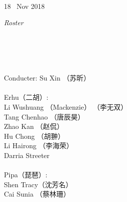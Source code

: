 \documentclass[letter,6pt,poets]{ConcProg}
\begin{document}
\begin{spacing}{1.0}
\begin{programme}{
\\  {\normalsize 18 ~Nov 2018}
}
\begin{part}[]
%

  \end{part}
  
  
\end{programme}

\begin{center}
\Large\textsl{ Roster}
\end{center}
\begin{multicols}{2}%

\\
\\
\\

\\
Conducter: Su Xin  （苏昕）
\\
\\
 Erhu（二胡）:                 \\
Li Wushuang （Mackenzie） （李无双）   \\
Tang Chenhao  （唐辰昊） \\
Zhao Kan （赵侃）\\
Hu Chong （胡翀）\\
Li Hairong （李海荣）\\
Darria Streeter\\
\\
Pipa（琵琶）:\\
Shen Tracy（沈芳名）\\
Cai Sunia （蔡林珊）\\


\end{multicols}
\end{spacing}
\end{document}
